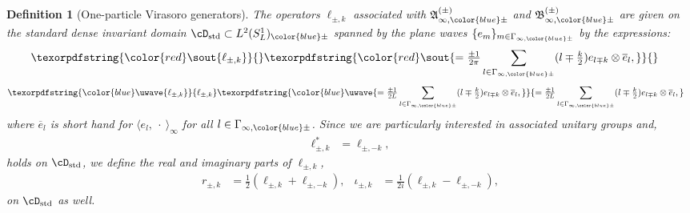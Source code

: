 \documentclass[a4paper, 11pt]{article}
\newcommand{\fA}{\mathfrak{A}}\newcommand{\cA}{\mathcal{A}}\newcommand{\dA}{\mathds{A}}\newcommand{\sA}{\mathscr{A}}
\newcommand{\fB}{\mathfrak{B}}\newcommand{\cB}{\mathcal{B}}\newcommand{\dB}{\mathds{B}}\newcommand{\sB}{\mathscr{B}}
\DeclareMathOperator{\1}{\mathds{1}}
\DeclareMathOperator{\std}{std}
\newtheorem{defn}[thm]{Definition}
\providecommand{\DIFaddtex}[1]{{\protect\color{blue}\uwave{#1}}} %
\providecommand{\DIFdeltex}[1]{{\protect\color{red}\sout{#1}}} %
\providecommand{\DIFaddbegin}{} %
\providecommand{\DIFaddend}{} %
\providecommand{\DIFdelbegin}{} %
\providecommand{\DIFdelend}{} %
\providecommand{\DIFadd}[1]{\texorpdfstring{\DIFaddtex{#1}}{#1}} %
\providecommand{\DIFdel}[1]{\texorpdfstring{\DIFdeltex{#1}}{}} %
\providecommand{\DIFscaledelfig}{0.5}
\newlength{\DIFdelgraphicswidth} %
\newlength{\DIFdelgraphicsheight} %
\providecommand{\DIFaddincludegraphics}[2][]{{\color{blue}\fbox{\DIFOincludegraphics[#1]{#2}}}} %
\providecommand{\DIFdelincludegraphics}[2][]{%
\sbox{\DIFdelgraphicsbox}{\DIFOincludegraphics[#1]{#2}}%
\settoboxwidth{\DIFdelgraphicswidth}{\DIFdelgraphicsbox} %
\settoboxtotalheight{\DIFdelgraphicsheight}{\DIFdelgraphicsbox} %
\scalebox{\DIFscaledelfig}{%
\parbox[b]{\DIFdelgraphicswidth}{\usebox{\DIFdelgraphicsbox}\\[-\baselineskip] \rule{\DIFdelgraphicswidth}{0em}}\llap{\resizebox{\DIFdelgraphicswidth}{\DIFdelgraphicsheight}{%
\setlength{\unitlength}{\DIFdelgraphicswidth}%
\begin{picture}(1,1)%
\thicklines\linethickness{2pt} %
{\color[rgb]{1,0,0}\put(0,0){\framebox(1,1){}}}%
{\color[rgb]{1,0,0}\put(0,0){\line( 1,1){1}}}%
{\color[rgb]{1,0,0}\put(0,1){\line(1,-1){1}}}%
\end{picture}%
}\hspace*{3pt}}} %
} %
\DeclareRobustCommand{\DIFaddbegin}{\DIFOaddbegin \let\includegraphics\DIFaddincludegraphics} %
\DeclareRobustCommand{\DIFaddend}{\DIFOaddend \let\includegraphics\DIFOincludegraphics} %
\DeclareRobustCommand{\DIFdelbegin}{\DIFOdelbegin \let\includegraphics\DIFdelincludegraphics} %
\DeclareRobustCommand{\DIFdelend}{\DIFOaddend \let\includegraphics\DIFOincludegraphics} %
\begin{document}
\begin{defn}[One-particle Virasoro generators]
\label{def:vir}
The operators $\ell_{\pm,k}$ associated with $\fA^{(\pm)}_{\infty,{\color{blue}\pm}}$ and $\fB^{(\pm)}_{\infty,{\color{blue}\pm}}$ are given on the standard dense invariant domain $\cD_{\std}\subset L^{2}(S^{1}_{L})_{{\color{blue}\pm}}$ spanned by the plane waves $\{e_{m}\}_{m\in\Gamma_{\infty,{\color{blue}\pm}}}$ by the expressions:
\DIFdelbegin \begin{align*}
\DIFdel{%
\ell_{\pm,k} }& \DIFdel{= \tfrac{\pm1}{2\pi}\sum_{l\in\Gamma_{\infty,{\color{blue}\pm}}}(l\mp\tfrac{k}{2})e_{l\mp k}\otimes \overline{e}_{l},
}\end{align*}%
\DIFdelend \DIFaddbegin \begin{align}
\DIFadd{\label{eq:contvira1p}
\ell_{\pm,k} }& \DIFadd{= \tfrac{\pm1}{2L}\sum_{l\in\Gamma_{\infty,{\color{blue}\pm}}}(l\mp\tfrac{k}{2})e_{l\mp k}\otimes \overline{e}_{l},
}\end{align}\DIFaddend 
where $\overline{e}_{l}$ is short hand for $\langle e_{l},\!\ \cdot\!\ \rangle_{\infty}$ for all $l\in\Gamma_{\infty,{\color{blue}\pm}}$. Since we are particularly interested in associated unitary groups and,
\begin{align}
\label{eq:contvira1pad}
\ell_{\pm,k}^{*} & = \ell_{\pm,-k},
\end{align}
holds on $\cD_{\std}$, we define the real and imaginary parts of $\ell_{\pm,k}$,
\begin{align}
\label{eq:contvira1pRI}
r_{\pm,k} & = \tfrac{1}{2}(\ell_{\pm,k}+\ell_{\pm,-k}), & \iota_{\pm,k} & = \tfrac{1}{2i}(\ell_{\pm,k}-\ell_{\pm,-k}),
\end{align}
on $\cD_{\std}$ as well.
\end{defn}
\DIFaddbegin 
\end{document}
